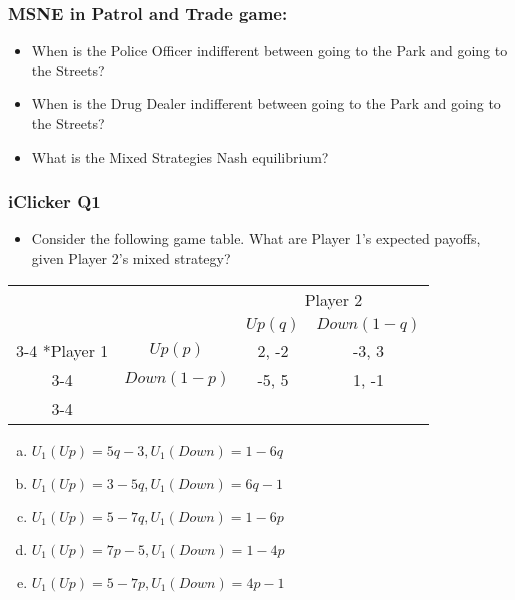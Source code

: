 \begin{frame}
\frametitle{MSNE in Patrol and Trade game:}
\begin{itemize}
\item When is the Police Officer indifferent between going to the Park and going to the Streets?
  \vspace{15mm}

\item When is the Drug Dealer indifferent between going to the Park and going to the Streets?
  \vspace{15mm}

  \item What is the \alert{Mixed Strategies Nash equilibrium?}
  \vspace{15mm}

\end{itemize}
\end{frame}


\begin{frame}
\frametitle{iClicker Q1}
\begin{itemize}
\item Consider the following game table. What are Player 1's expected payoffs, given Player 2's mixed strategy?
\end{itemize}
\begin{table}[h]
\centering
\begin{tabular}{cc|c|c|}
	& \multicolumn{1}{c}{} & \multicolumn{2}{c}{Player 2}\\
	& \multicolumn{1}{c}{} & \multicolumn{1}{c}{$Up (q)$}  & \multicolumn{1}{c}{$Down (1 - q)$} \\\cline{3-4}
	\multirow{2}*{Player 1}  & $Up (p)$ & 2, -2 & -3, 3 \\\cline{3-4}
	& $Down (1 - p)$ & -5, 5 & 1, -1 \\\cline{3-4}
\end{tabular}
\end{table}
  \begin{enumerate}[(a)]
\item $U_1(Up) = 5q - 3, U_1(Down) = 1 - 6q$
\item $U_1(Up) = 3 - 5q, U_1(Down) = 6q - 1$
\item $U_1(Up) = 5 - 7q, U_1(Down) = 1 - 6p$
\item $U_1(Up) = 7p - 5, U_1(Down) = 1 - 4p$
\item $U_1(Up) = 5 - 7p, U_1(Down) = 4p - 1$
\end{enumerate}
\end{frame}


